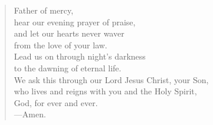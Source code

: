 \prayer

\setlength{\vleftmargin}{\prayerleftmargini}

\begin{verse}
Father of mercy,\\
hear our evening prayer of praise,\\
and let our hearts never waver\\
from the love of your law.\\
Lead us on through night’s darkness\\
to the dawning of eternal life.\\
We ask this through our Lord Jesus Christ, your Son,\\
who lives and reigns with you and the Holy Spirit,\\
God, for ever and ever.\\
{\color{red}---\thinspace}Amen.
\end{verse}

\setlength{\vleftmargin}{\defleftmargini}